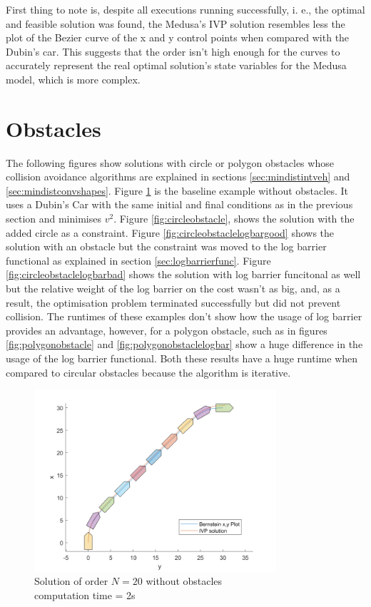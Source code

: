 \par First thing to note is, despite all executions running successfully, i. e., the optimal and feasible solution was found, the Medusa's \ac{IVP} solution resembles less the plot of the Bezier curve of the x and y control points when compared with the Dubin's car. This suggests that the order isn't high enough for the curves to accurately represent the real optimal solution's state variables for the Medusa model, which is more complex. 


\section{Obstacles}

\par The following figures show solutions with circle or polygon obstacles whose collision avoidance algorithms are explained in sections \ref{sec:mindistintveh} and \ref{sec:mindistconvshapes}. Figure \ref{fig:baselineresult} is the baseline example without obstacles. It uses a Dubin's Car with the same initial and final conditions as in the previous section and minimises $v^2$. Figure \ref{fig:circleobstacle}, shows the solution with the added circle as a constraint. Figure \ref{fig:circleobstaclelogbargood} shows the solution with an obstacle but the constraint was moved to the log barrier functional as explained in section \ref{sec:logbarrierfunc}. Figure \ref{fig:circleobstaclelogbarbad} shows the solution with log barrier funcitonal as well but the relative weight of the log barrier on the cost wasn't as big, and, as a result, the optimisation problem terminated successfully but did not prevent collision. The runtimes of these examples don't show how the usage of log barrier provides an advantage, however, for a polygon obstacle, such as in figures \ref{fig:polygonobstacle} and \ref{fig:polygonobstaclelogbar} show a huge difference in the usage of the log barrier functional. Both these results have a huge runtime when compared to circular obstacles because the algorithm is iterative.

\begin{figure}[h!]
\centering
\includegraphics[width=0.8\textwidth]{Images/results/baselineresult.png}
\caption{Solution of order $N=20$ without obstacles \\ computation time = 2s}
\label{fig:baselineresult}
\end{figure}

